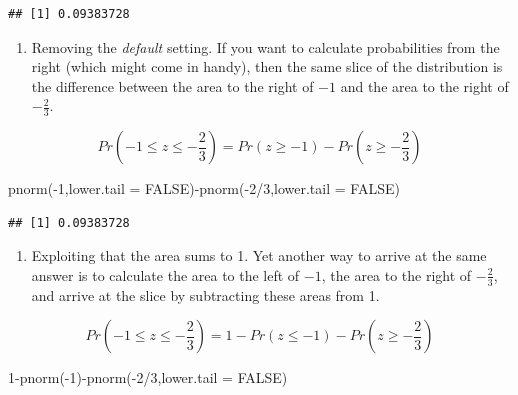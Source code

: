 \documentclass[
]{book}
\newenvironment{Shaded}{\begin{snugshade}}{\end{snugshade}}
\newcommand{\AttributeTok}[1]{\textcolor[rgb]{0.77,0.63,0.00}{#1}}
\newcommand{\ConstantTok}[1]{\textcolor[rgb]{0.00,0.00,0.00}{#1}}
\newcommand{\DecValTok}[1]{\textcolor[rgb]{0.00,0.00,0.81}{#1}}
\newcommand{\FunctionTok}[1]{\textcolor[rgb]{0.00,0.00,0.00}{#1}}
\newcommand{\NormalTok}[1]{#1}
\newcommand{\SpecialCharTok}[1]{\textcolor[rgb]{0.00,0.00,0.00}{#1}}
\providecommand{\tightlist}{%
  \setlength{\itemsep}{0pt}\setlength{\parskip}{0pt}}
\begin{document}
\begin{verbatim}
## [1] 0.09383728
\end{verbatim}

\begin{enumerate}
\def\labelenumi{\arabic{enumi}.}
\setcounter{enumi}{1}
\tightlist
\item
  Removing the \emph{default} setting. If you want to calculate probabilities from the right (which might come in handy), then the same slice of the distribution is the difference between the area to the right of \(-1\) and the area to the right of \(-\frac{2}{3}\).
\end{enumerate}

\[Pr\left(-1 \leq z \leq -\frac{2}{3}\right)=Pr(z \geq -1) - Pr\left(z \geq -\frac{2}{3}\right)\]

\begin{Shaded}
\begin{Highlighting}[]
\FunctionTok{pnorm}\NormalTok{(}\SpecialCharTok{{-}}\DecValTok{1}\NormalTok{,}\AttributeTok{lower.tail =} \ConstantTok{FALSE}\NormalTok{)}\SpecialCharTok{{-}}\FunctionTok{pnorm}\NormalTok{(}\SpecialCharTok{{-}}\DecValTok{2}\SpecialCharTok{/}\DecValTok{3}\NormalTok{,}\AttributeTok{lower.tail =} \ConstantTok{FALSE}\NormalTok{)}
\end{Highlighting}
\end{Shaded}

\begin{verbatim}
## [1] 0.09383728
\end{verbatim}

\begin{enumerate}
\def\labelenumi{\arabic{enumi}.}
\setcounter{enumi}{2}
\tightlist
\item
  Exploiting that the area sums to 1. Yet another way to arrive at the same answer is to calculate the area to the left of \(-1\), the area to the right of \(-\frac{2}{3}\), and arrive at the slice by subtracting these areas from 1.
\end{enumerate}

\[Pr\left(-1 \leq z \leq -\frac{2}{3}\right)=1 - Pr(z \leq -1) - Pr\left(z \geq -\frac{2}{3}\right)\]

\begin{Shaded}
\begin{Highlighting}[]
\DecValTok{1}\SpecialCharTok{{-}}\FunctionTok{pnorm}\NormalTok{(}\SpecialCharTok{{-}}\DecValTok{1}\NormalTok{)}\SpecialCharTok{{-}}\FunctionTok{pnorm}\NormalTok{(}\SpecialCharTok{{-}}\DecValTok{2}\SpecialCharTok{/}\DecValTok{3}\NormalTok{,}\AttributeTok{lower.tail =} \ConstantTok{FALSE}\NormalTok{)}
\end{Highlighting}
\end{Shaded}
\end{document}
